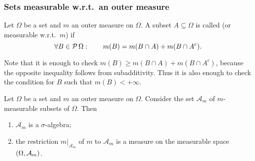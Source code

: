 \subsubsection{Sets measurable w.r.t.\ an outer measure}
\begin{definition}
Let $\Omega$ be a set and $m$ an outer measure on $\Omega$. A subset $A\subseteq \Omega$ is called  (or measurable w.r.t.\ $m$) if
\[ \forall B\in\operatorname{\mathcal{P}}{\Omega}: \qquad m(B) = m(B\cap A) + m(B\cap A^c). \]
\end{definition}
Note that it is enough to check $m(B) \geq m(B\cap A) + m(B\cap A^c)$, because the opposite inequality follows from subadditivity. Thus it is also enough to check the condition for $B$ such that $m(B) < +\infty$.

\begin{theorem}
Let $\Omega$ be a set and $m$ an outer measure on $\Omega$. Consider the set $\mathcal{A}_m$ of $m$-measurable subsets of $\Omega$. Then
\begin{enumerate}
\item $\mathcal{A}_m$ is a $\sigma$-algebra;
\item the restriction $m|_{\mathcal{A}_m}$ of $m$ to $\mathcal{A}_m$ is a measure on the measurable space $\left( \Omega,\mathcal{A}_m \right)$.
\end{enumerate}
\end{theorem}
